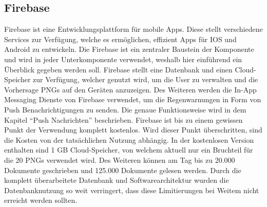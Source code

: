 \subsection{Firebase}\label{firebase}
Firebase ist eine Entwicklungsplattform für mobile Apps. 
Diese stellt verschiedene Services zur Verfügung, welche es ermöglichen, effizient Apps für IOS und Android zu entwickeln. 
Die Firebase ist ein zentraler Baustein der Komponente und wird in jeder Unterkomponente verwendet, weshalb hier einführend 
ein Überblick gegeben werden soll. 
Firebase stellt eine Datenbank und einen Cloud-Speicher zur Verfügung, welcher genutzt wird, um die User zu verwalten und die 
Vorhersage PNGs auf den Geräten anzuzeigen.
Des Weiteren werden die In-App Messaging Dienste von Firebase verwendet, um die Regenwarnungen in Form von Push Benachrichtigungen zu senden. 
Die genaue Funktionsweise wird in dem Kapitel “Push Nachrichten” beschrieben.   
Firebase ist bis zu einem gewissen Punkt der Verwendung komplett kostenlos. 
Wird dieser Punkt überschritten, sind die Kosten von der tatsächlichen Nutzung abhängig. 
In der kostenlosen Version enthalten sind 1 GB Cloud-Speicher, von welchem aktuell nur ein Bruchteil für die 20 PNGs 
verwendet wird. Des Weiteren können am Tag bis zu 20.000 Dokumente geschrieben und 125.000 Dokumente gelesen werden. 
Durch die komplett überarbeitete Datenbank und Softwarearchitektur wurden die Datenbanknutzung so weit verringert, 
dass diese Limitierungen bei Weitem nicht erreicht werden sollten.